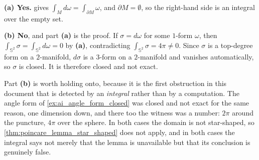 \begin{answer}
\textbf{(a) Yes.}  gives
$\int_M d\omega = \int_{\partial M}\omega$, and $\partial M = \emptyset$, so the right-hand side
is an integral over the empty set.

\textbf{(b) No}, and part \textbf{(a)} is the proof. If $\sigma = d\omega$ for some $1$-form
$\omega$, then $\int_{\mathbb{S}^2}\sigma = \int_{\mathbb{S}^2}d\omega = 0$ by \textbf{(a)},
contradicting $\int_{\mathbb{S}^2}\sigma = 4\pi \neq 0$. Since $\sigma$ is a top-degree form on a
$2$-manifold, $d\sigma$ is a $3$-form on a $2$-manifold and vanishes automatically, so $\sigma$ is
closed. It is therefore closed and not exact.
\end{answer}

\begin{ainote}
Part \textbf{(b)} is worth holding onto, because it is the first obstruction in this document
that is detected by an \emph{integral} rather than by a computation. The angle form of
\cref{ex:ai_angle_form_closed} was closed and not exact for the same reason, one dimension down,
and there too the witness was a number: $2\pi$ around the puncture, $4\pi$ over the sphere. In
both cases the domain is not star-shaped, so \cref{thm:poincare_lemma_star_shaped} does not apply, and in
both cases the integral says not merely that the lemma is unavailable but that its conclusion is
genuinely false.
\end{ainote}
